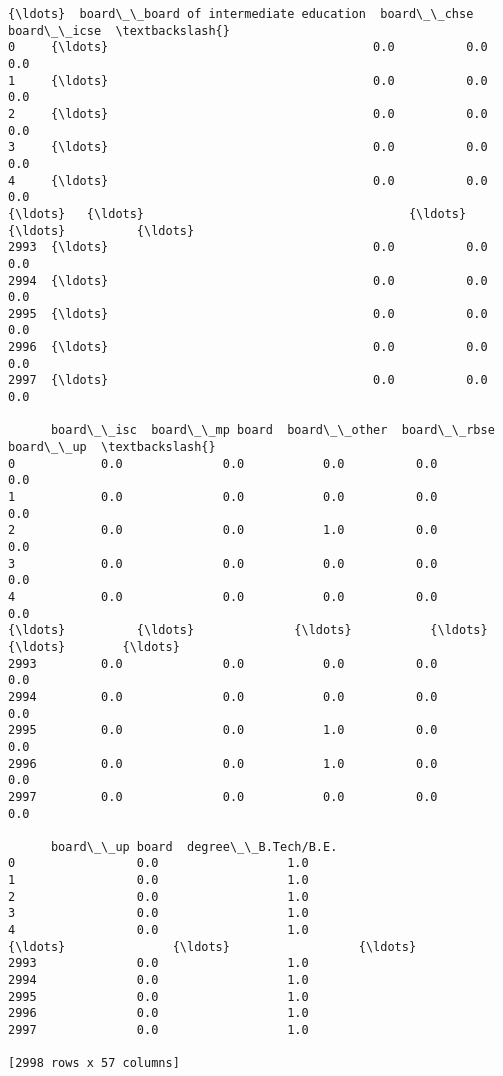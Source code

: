 \documentclass[11pt]{article}
\begin{document}
\begin{tcolorbox}[breakable, size=fbox, boxrule=.5pt, pad at break*=1mm, opacityfill=0]
\begin{Verbatim}[commandchars=\\\{\}]
      {\ldots}  board\_\_board of intermediate education  board\_\_chse  board\_\_icse  \textbackslash{}
0     {\ldots}                                     0.0          0.0          0.0
1     {\ldots}                                     0.0          0.0          0.0
2     {\ldots}                                     0.0          0.0          0.0
3     {\ldots}                                     0.0          0.0          0.0
4     {\ldots}                                     0.0          0.0          0.0
{\ldots}   {\ldots}                                     {\ldots}          {\ldots}          {\ldots}
2993  {\ldots}                                     0.0          0.0          0.0
2994  {\ldots}                                     0.0          0.0          0.0
2995  {\ldots}                                     0.0          0.0          0.0
2996  {\ldots}                                     0.0          0.0          0.0
2997  {\ldots}                                     0.0          0.0          0.0

      board\_\_isc  board\_\_mp board  board\_\_other  board\_\_rbse  board\_\_up  \textbackslash{}
0            0.0              0.0           0.0          0.0        0.0
1            0.0              0.0           0.0          0.0        0.0
2            0.0              0.0           1.0          0.0        0.0
3            0.0              0.0           0.0          0.0        0.0
4            0.0              0.0           0.0          0.0        0.0
{\ldots}          {\ldots}              {\ldots}           {\ldots}          {\ldots}        {\ldots}
2993         0.0              0.0           0.0          0.0        0.0
2994         0.0              0.0           0.0          0.0        0.0
2995         0.0              0.0           1.0          0.0        0.0
2996         0.0              0.0           1.0          0.0        0.0
2997         0.0              0.0           0.0          0.0        0.0

      board\_\_up board  degree\_\_B.Tech/B.E.
0                 0.0                  1.0
1                 0.0                  1.0
2                 0.0                  1.0
3                 0.0                  1.0
4                 0.0                  1.0
{\ldots}               {\ldots}                  {\ldots}
2993              0.0                  1.0
2994              0.0                  1.0
2995              0.0                  1.0
2996              0.0                  1.0
2997              0.0                  1.0

[2998 rows x 57 columns]
\end{Verbatim}
\end{tcolorbox}
        
\end{document}
